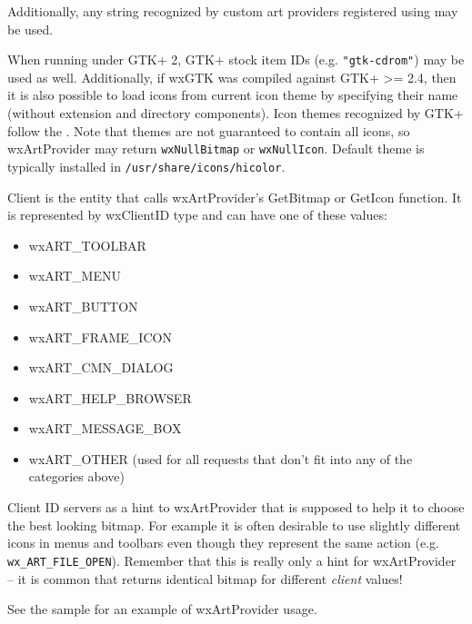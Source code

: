 Additionally, any string recognized by custom art providers registered using 
 may be used.


When running under GTK+ 2, GTK+ stock item IDs (e.g. {\tt "gtk-cdrom"}) may
be used as well. Additionally, if wxGTK was compiled against GTK+ >= 2.4, then
it is also possible to load icons from current icon theme by specifying their
name (without extension and directory components). Icon themes recognized
by GTK+ follow the
. Note that themes are not guaranteed to contain all
icons, so wxArtProvider may return {\tt wxNullBitmap} or {\tt wxNullIcon}.
Default theme is typically installed in {\tt /usr/share/icons/hicolor}.


\label{artproviderclients}

Client is the entity that calls wxArtProvider's GetBitmap or GetIcon
function. It is represented by wxClientID type and can have one of these 
values:
\begin{itemize}\itemsep=0pt
\item wxART\_TOOLBAR
\item wxART\_MENU
\item wxART\_BUTTON
\item wxART\_FRAME\_ICON
\item wxART\_CMN\_DIALOG
\item wxART\_HELP\_BROWSER
\item wxART\_MESSAGE\_BOX
\item wxART\_OTHER (used for all requests that don't fit into any of the categories above)
\end{itemize}
Client ID servers as a hint to wxArtProvider that is supposed to help it to
choose the best looking bitmap. For example it is often desirable to use
slightly different icons in menus and toolbars even though they represent the
same action (e.g. {\tt wx\_ART\_FILE\_OPEN}). Remember that this is really
only a hint for wxArtProvider -- it is common that
returns identical bitmap for different {\it client} values!


See the  sample for an example of wxArtProvider usage.


